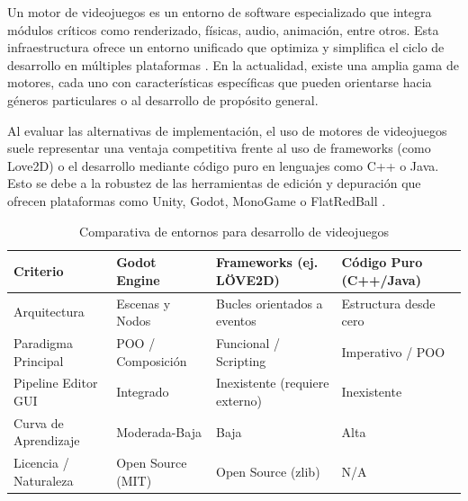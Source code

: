 Un motor de videojuegos es un entorno de software especializado que integra módulos críticos como renderizado, físicas, audio, animación, entre otros. Esta infraestructura ofrece un entorno unificado que optimiza y simplifica el ciclo de desarrollo en múltiples plataformas \cite{arm2026gamingengine}. En la actualidad, existe una amplia gama de motores, cada uno con características específicas que pueden orientarse hacia géneros particulares o al desarrollo de propósito general.

Al evaluar las alternativas de implementación, el uso de motores de videojuegos suele representar una ventaja competitiva frente al uso de frameworks (como Love2D) o el desarrollo mediante código puro en lenguajes como C++ o Java. Esto se debe a la robustez de las herramientas de edición y depuración que ofrecen plataformas como Unity, Godot, MonoGame o FlatRedBall \cite{microsoft2026dotnetengines}.

\begin{table}[h!]
\centering
\caption{Comparativa de entornos para desarrollo de videojuegos}
\label{tab:motores_comparativa}

\begin{tabularx}{\textwidth}{|>{\raggedright\arraybackslash}p{3.0cm}|
                              >{\centering\arraybackslash}X|
                              >{\centering\arraybackslash}X|
                              >{\centering\arraybackslash}X|}
\hline

\textbf{Criterio} &
\textbf{Godot Engine} &
\textbf{Frameworks (ej. LÖVE2D)} &
\textbf{Código Puro (C++/Java)} \\ \hline

Arquitectura &
Escenas y Nodos &
Bucles orientados a eventos &
Estructura desde cero \\ \hline

Paradigma Principal &
POO / Composición &
Funcional / Scripting &
Imperativo / POO \\ \hline

Pipeline Editor GUI &
Integrado &
Inexistente (requiere externo) &
Inexistente \\ \hline

Curva de Aprendizaje &
Moderada-Baja &
Baja &
Alta \\ \hline

Licencia / Naturaleza &
Open Source (MIT) &
Open Source (zlib) &
N/A \\ \hline

\end{tabularx}

\end{table}

